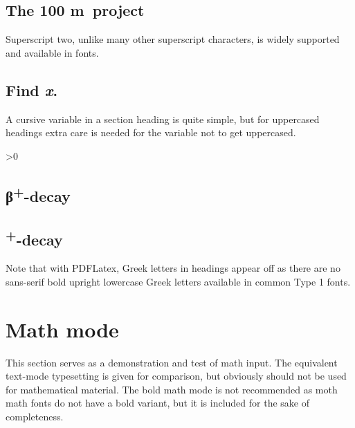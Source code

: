 \documentclass[twoside,draftfooter]{tutthesis} %
\begin{document}
\subsection{The 100 m\texttwosuperior\ project}

Superscript two, unlike many other superscript characters, is widely supported and available in fonts.

\newcommand*{\varx}{x}
\subsection{Find \textit{\protect\varx}.} %

A cursive variable in a section heading is quite simple, but for uppercased headings extra care is needed for the variable not to get uppercased.

\newcommand*{\plussuperior}{\textsuperscript{+}}

\fi{}\fi>0
  \newcommand*{\tbeta}{β}
  \subsection{\protect\tbeta\plussuperior-decay} %
\else\ifx\textgreekfontmap\undefined\else
  \subsection{\protect\textbeta\plussuperior-decay}
  Note that with PDFLatex, Greek letters in headings appear off as there are no sans-serif bold upright lowercase Greek letters available in common Type 1 fonts.
\fi\fi


\section{Math mode}

This section serves as a demonstration and test of math input.
The equivalent text-mode typesetting is given for comparison, but obviously should not be used for mathematical material.
The bold math mode is not recommended as moth math fonts do not have a bold variant, but it is included for the sake of completeness.
\end{document}
